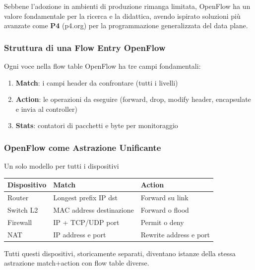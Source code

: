 \documentclass[
  italian,
  openany]{book}
\newcounter{none} %
\providecommand{\tightlist}{%
  \setlength{\itemsep}{0pt}\setlength{\parskip}{0pt}}
\begin{document}
Sebbene l'adozione in ambienti di produzione rimanga limitata, OpenFlow
ha un valore fondamentale per la ricerca e la didattica, avendo ispirato
soluzioni più avanzate come \textbf{P4} (p4.org) per la programmazione
generalizzata del data plane.

\subsubsection{Struttura di una Flow Entry
OpenFlow}\label{struttura-di-una-flow-entry-openflow}

Ogni voce nella flow table OpenFlow ha tre campi fondamentali:

\begin{enumerate}
\def\labelenumi{\arabic{enumi}.}
\tightlist
\item
  \textbf{Match}: i campi header da confrontare (tutti i livelli)
\item
  \textbf{Action}: le operazioni da eseguire (forward, drop, modify
  header, encapsulate e invia al controller)
\item
  \textbf{Stats}: contatori di pacchetti e byte per monitoraggio
\end{enumerate}

\subsubsection{OpenFlow come Astrazione
Unificante}\label{openflow-come-astrazione-unificante}

\begin{callouttip}{Un solo modello per tutti i dispositivi}

{\def\LTcaptype{none} %
\begin{longtable}[]{@{}lll@{}}
\toprule\noalign{}
Dispositivo & Match & Action \\
\midrule\noalign{}
\endhead
\bottomrule\noalign{}
\endlastfoot
Router & Longest prefix IP dst & Forward su link \\
Switch L2 & MAC address destinazione & Forward o flood \\
Firewall & IP + TCP/UDP port & Permit o deny \\
NAT & IP address e port & Rewrite address e port \\
\end{longtable}
}

Tutti questi dispositivi, storicamente separati, diventano istanze della
stessa astrazione match+action con flow table diverse.

\end{callouttip}
\end{document}
